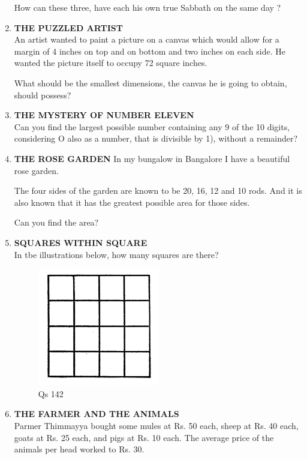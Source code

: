 \documentclass[12pt]{article}
\begin{document}
\begin{enumerate}
How  can these  three,  have  each  his own  true  Sabbath on the same  day ? 


\item \textbf{THE  PUZZLED  ARTIST} \\
An artist  wanted  to paint  a picture  on a canvas  which would  allow  for a margin  of 4 inches  on top  and  on bottom  and  two  inches  on each  side.  He  wanted  the picture  itself  to occupy  72 square  inches. 

What  should  be the smallest  dimensions,  the canvas  he is going  to obtain,  should  possess? 


\item \textbf{THE  MYSTERY  OF NUMBER  ELEVEN} \\ 
Can you  find  the  largest  possible  number  containing any 9 of the 10 digits,  considering  O also  as a number, that is divisible  by 1), without  a remainder? 


\item \textbf{THE  ROSE  GARDEN}
In my bungalow  in Bangalore  I have  a beautiful  rose garden. 

The four  sides  of the garden  are known  to be 20,  16, 12 and 10 rods.  And  it is also  known  that  it has  the greatest  possible  area  for those  sides. 

Can you  find  the area? 

\item \textbf{SQUARES  WITHIN  SQUARE} \\ 
In tbe illustrations  below,  how  many  squares  are there? 
\begin{figure}[h]
\begin{center}
\includegraphics[width=0.5\textwidth]{sdevi_q142.png}
\caption{ Qs 142}
\end{center}
\end{figure}


\item \textbf{THE  FARMER  AND  THE  ANIMALS} \\
Parmer  Thimmayya  bought  some  mules  at Rs.  50 each,  sheep  at Rs.  40 each,  goats  at Rs.  25 each,  and pigs at Rs. 10 each.  The  average  price  of the  animals per head  worked  to Rs. 30. 


\end{enumerate}
\end{document}

